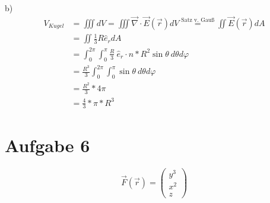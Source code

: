 \documentclass[a4paper]{article}
\begin{document}
\par{b)}
\begin{align*}
	V_{Kugel} 
	&= \iiint dV = \iiint \vec{\nabla} \cdot \vec{E}(\vec{r})dV \overset{\text{Satz v. Gauß}}{=}
	\iint \vec{E}(\vec{r})dA \\
	&= \iint \frac{1}{3} R \hat{e}_r dA \\
	&= \int_0^{2\pi} \int_0^\pi \frac{R}{3} \ \hat{e}_r \cdot \hat{n} * R^2\sin\theta \ d\theta d\varphi \\
	&= \frac{R^3}{3} \int_0^{2\pi} \int_0^\pi \sin\theta \ d\theta d\varphi \\
	&= \frac{R^2}{3} * 4\pi \\
	&= \frac{4}{3} * \pi * R^3
\end{align*}

\newpage
\section*{Aufgabe 6}
\[
	\vec F (\vec r) = 
	\begin{pmatrix}
		y^3 \\ x^2 \\ z
	\end{pmatrix}
\]
\end{document}
